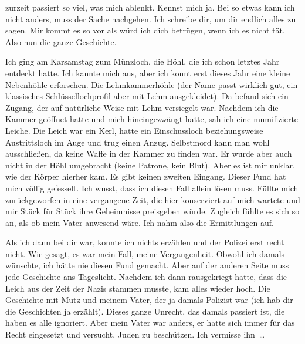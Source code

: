 zurzeit passiert so viel, was mich ablenkt. Kennst mich ja. Bei so etwas kann ich nicht anders, muss
der Sache nachgehen. Ich schreibe dir, um dir endlich alles zu sagen. Mir kommt es so vor als würd
ich dich betrügen, wenn ich es nicht tät. Also nun die ganze Geschichte.

Ich ging am Karsamstag zum Münzloch, die Höhl, die ich schon letztes Jahr entdeckt hatte. Ich kannte
mich aus, aber ich konnt erst dieses Jahr eine kleine Nebenhöhle erforschen. Die Lehmkammerhöhle
(der Name passt wirklich gut, ein klassisches Schlüssellochprofil aber mit Lehm ausgekleidet). Da
befand sich ein Zugang, der auf natürliche Weise mit Lehm versiegelt war. Nachdem ich die Kammer
geöffnet hatte und mich hineingezwängt hatte, sah ich eine mumifizierte Leiche. Die Leich war ein
Kerl, hatte ein Einschussloch beziehungsweise Austrittsloch im Auge und trug einen Anzug. Selbstmord
kann man wohl ausschließen, da keine Waffe in der Kammer zu finden war. Er wurde aber auch nicht
in der Höhl umgebracht (keine Patrone, kein Blut). Aber es ist mir unklar, wie der Körper hierher
kam. Es gibt keinen zweiten Eingang. Dieser Fund hat mich völlig gefesselt. Ich wusst, dass ich
diesen Fall allein lösen muss. Füllte mich zurückgeworfen in eine vergangene Zeit, die hier
konserviert auf mich wartete und mir Stück für Stück ihre Geheimnisse preisgeben würde. Zugleich
fühlte es sich so an, als ob mein Vater anwesend wäre. Ich nahm also die Ermittlungen auf.

Als ich dann bei dir war, konnte ich nichts erzählen und der Polizei erst recht nicht. Wie gesagt,
es war mein Fall, meine Vergangenheit. Obwohl ich damals wünschte, ich hätte nie diesen Fund
gemacht.
Aber auf der anderen Seite muss jede Geschichte ans Tageslicht.
Nachdem ich dann rausgekriegt hatte, dass die Leich aus der Zeit der Nazis stammen musste, kam alles
wieder hoch. Die Geschichte mit Mutz und meinem Vater, der ja damals Polizist war (ich hab dir die
Geschichten ja erzählt). Dieses ganze Unrecht, das damals passiert ist, die haben es alle ignoriert.
Aber mein Vater war anders, er hatte sich immer für das Recht eingesetzt und versucht, Juden zu
beschützen. Ich vermisse ihn~\dots

